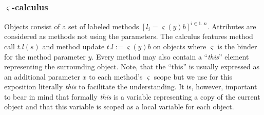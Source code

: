 \documentclass[10pt, conference, compsocconf]{IEEEtran}
\begin{document}
\subsubsection{$\varsigma$-calculus}
Objects consist of a set of labeled methods $[l_i = \varsigma(y)b]^{i\in1..n}$. Attributes 
are considered as methods not using the parameters. 
The calculus features method call $t.l(s)$ and method update $t.l := \varsigma (y) b$ on objects where
$\varsigma$ is the binder for the method parameter $y$. Every method may also contain a ``{\it this}'' element 
representing the surrounding object. Note, that the ``this'' is usually \cite{AC96a} expressed as an additional
parameter $x$ to each method's $\varsigma$ scope but we use for this exposition literally 
{\it this} to facilitate the understanding. It is, however, important to bear in mind that 
formally {\it this} is a variable representing a copy of the current object and that this 
variable is scoped as a local variable for each object.
\end{document}
